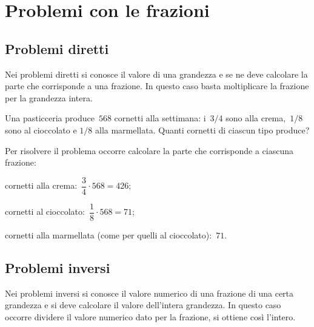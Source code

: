 \ovalbox{\risolvii \ref{ese:3.74}, \ref{ese:3.75}, \ref{ese:3.76}}

\section{Problemi con le frazioni}

\subsection{Problemi diretti}
Nei problemi diretti si conosce il valore di una grandezza e se ne deve calcolare la parte
che corrisponde a una frazione. In questo caso basta moltiplicare la
frazione per la grandezza intera.

\begin{exrig}
 \begin{esempio}
Una pasticceria produce~$568$ cornetti alla settimana: i~$3/4$ sono alla crema,~$1/8$ sono al cioccolato e
$1/8$ alla marmellata. Quanti cornetti di ciascun tipo produce?

Per risolvere il problema occorre calcolare la parte che corrisponde a ciascuna frazione:
\begin{itemize*}
\item cornetti alla crema:~$\dfrac{3}{4}\cdot 568 =426$;
\item cornetti al cioccolato:~$\dfrac{1}{8}\cdot 568 =71$;
\item cornetti alla marmellata (come per quelli al cioccolato):~$71$.
\end{itemize*}
 \end{esempio}
\end{exrig}

\subsection{Problemi inversi}

Nei problemi inversi si conosce il valore numerico di una frazione di una certa grandezza e
si deve calcolare il valore dell'intera grandezza.
In questo caso occorre dividere il valore numerico dato per la frazione, si ottiene così l'intero.

